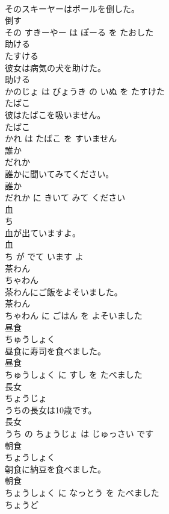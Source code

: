 \documentclass[8pt]{extreport}
\begin{document}
\begin{CJK}{UTF8}{min}
\\	そのスキーヤーはポールを倒した。	
\\	倒す 
\\	その すきーやー は ぽーる を たおした			
\\	助ける	
\\	たすける			
\\	彼女は病気の犬を助けた。	
\\	助ける 
\\	かのじょ は びょうき の いぬ を たすけた			
\\	たばこ	
\\	彼はたばこを吸いません。	
\\	たばこ 
\\	かれ は たばこ を すいません			
\\	誰か	
\\	だれか			
\\	誰かに聞いてみてください。	
\\	誰か 
\\	だれか に きいて みて ください			
\\	血	
\\	ち			
\\	血が出ていますよ。	
\\	血 
\\	ち が でて います よ			
\\	茶わん	
\\	ちゃわん			
\\	茶わんにご飯をよそいました。	
\\	茶わん 
\\	ちゃわん に ごはん を よそいました			
\\	昼食	
\\	ちゅうしょく			
\\	昼食に寿司を食べました。	
\\	昼食 
\\	ちゅうしょく に すし を たべました			
\\	長女	
\\	ちょうじょ			
\\	うちの長女は10歳です。	
\\	長女 
\\	うち の ちょうじょ は じゅっさい です			
\\	朝食	
\\	ちょうしょく			
\\	朝食に納豆を食べました。	
\\	朝食 
\\	ちょうしょく に なっとう を たべました			
\\	ちょうど	

\end{CJK}
\end{document}
